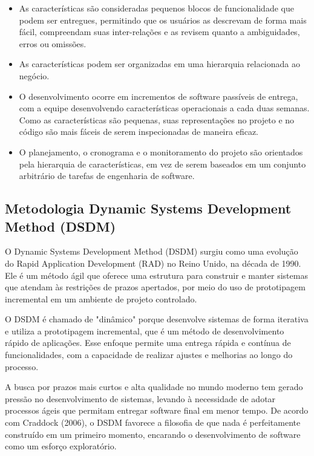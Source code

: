 \begin{itemize}
	\item As características são consideradas pequenos blocos de funcionalidade que podem ser entregues, permitindo que os usuários as descrevam de forma mais fácil, compreendam suas inter-relações e as revisem quanto a ambiguidades, erros ou omissões.
	\item As características podem ser organizadas em uma hierarquia relacionada ao negócio.
	\item O desenvolvimento ocorre em incrementos de software passíveis de entrega, com a equipe desenvolvendo características operacionais a cada duas semanas. Como as características são pequenas, suas representações no projeto e no código são mais fáceis de serem inspecionadas de maneira eficaz.
	\item O planejamento, o cronograma e o monitoramento do projeto são orientados pela hierarquia de características, em vez de serem baseados em um conjunto arbitrário de tarefas de engenharia de software.

\end{itemize}

\subsection{Metodologia Dynamic Systems Development Method (DSDM)}
O Dynamic Systems Development Method (DSDM) surgiu como uma evolução do Rapid Application Development (RAD) no Reino Unido, na década de 1990. Ele é um método ágil que oferece uma estrutura para construir e manter sistemas que atendam às restrições de prazos apertados, por meio do uso de prototipagem incremental em um ambiente de projeto controlado.

O DSDM é chamado de "dinâmico" porque desenvolve sistemas de forma iterativa e utiliza a prototipagem incremental, que é um método de desenvolvimento rápido de aplicações. Esse enfoque permite uma entrega rápida e contínua de funcionalidades, com a capacidade de realizar ajustes e melhorias ao longo do processo.

A busca por prazos mais curtos e alta qualidade no mundo moderno tem gerado pressão no desenvolvimento de sistemas, levando à necessidade de adotar processos ágeis que permitam entregar software final em menor tempo. De acordo com Craddock (2006), o DSDM favorece a filosofia de que nada é perfeitamente construído em um primeiro momento, encarando o desenvolvimento de software como um esforço exploratório.

